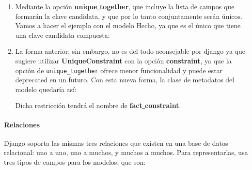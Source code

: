    \begin{enumerate}
        \item Mediante la opción \textbf{unique\underline{ }together}, que incluye la lista
        de campos que formarán la clave candidata, y que por lo tanto conjuntamente serán
        únicos. Vamos a hacer el ejemplo con el modelo Hecho, ya que es el único que tiene
        una clave candidata compuesta:
        

        \item La forma anterior, sin embargo, no es del todo aconsejable por django ya
        que sugiere utilizar \textbf{UniqueConstraint} con la opción \textbf{constraint},
        ya que la opción de \verb|unique_together| ofrece menor funcionalidad y puede
        estar deprecated en un futuro. Con esta nueva forma, la clase de metadatos
        del modelo quedaría así:
        

    Dicha restricción tendrá el nombre de \textbf{fact\underline{ }constraint}.
    \end{enumerate}

    \paragraph{Relaciones} \underline{}
    \newline Django soporta las mismas tres relaciones que existen en una base de datos relacional:
    uno a uno, uno a muchos, y muchos a muchos. Para representarlas, usa tres tipos de campos
    para los modelos, que son:

